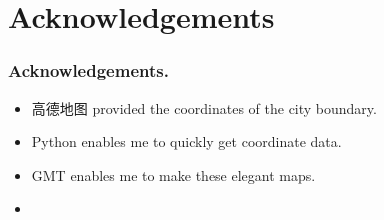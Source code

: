 \section{Acknowledgements}
\begin{frame}
    \frametitle{Acknowledgements.}
    \begin{itemize}
        \item 高德地图 provided the coordinates of the city boundary.
        \item Python enables me to quickly get coordinate data.
        \item GMT enables me to make these elegant maps.
        \item 
    \end{itemize}
\end{frame}